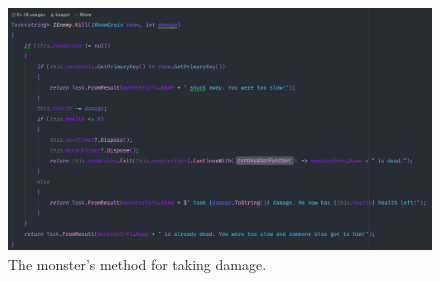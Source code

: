 \begin{figure}
	\centering
	\includegraphics[width=\linewidth]{Materials/Decomposition/Boss/MonsterKill}
	\caption{The monster's method for taking damage.}
	\label{MonsterKill}
\end{figure}

